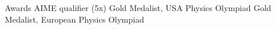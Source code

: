 \begin{rubric}{Awards}
    \entry*[2020-2024]AIME qualifier (5x)
    \entry*[2024] Gold Medalist, USA Physics Olympiad 
    \entry*[2024] Gold Medalist, European Physics Olympiad
\end{rubric}